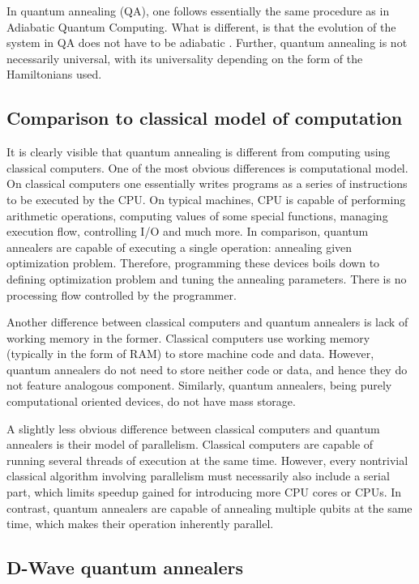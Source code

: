 In quantum annealing (QA), one follows essentially the same procedure as in Adiabatic Quantum
Computing. What is different, is that the evolution of the system in QA does not have to be
adiabatic \cite{Vinci2017}. Further, quantum annealing is not necessarily universal, with its
universality depending on the form of the Hamiltonians used. 


\subsection{Comparison to classical model of computation}
It is clearly visible that quantum annealing is different from computing using classical computers. One of the most obvious differences is computational model. On classical computers one essentially writes programs as a series of instructions to be executed by the CPU. On typical machines, CPU is capable of performing arithmetic operations, computing values of some special functions, managing execution flow, controlling I/O and much more. In comparison, quantum annealers are capable of executing a single operation: annealing given optimization problem. Therefore, programming these devices boils down to defining optimization problem and tuning the annealing parameters. There is no processing flow controlled by the programmer.

Another difference between classical computers and quantum annealers is lack of working memory in the former. Classical computers use working memory (typically in the form of RAM) to store machine code and data. However, quantum annealers do not need to store neither code or data, and hence they do not feature analogous component. Similarly, quantum annealers, being purely computational oriented devices, do not have mass storage.

A slightly less obvious difference between classical computers and quantum annealers is their model of parallelism. Classical computers are capable of running several threads of execution at the same time. However, every nontrivial classical algorithm involving parallelism must necessarily also include a serial part, which limits speedup gained for introducing more CPU cores or CPUs. In contrast, quantum annealers are capable of annealing multiple qubits at the same time, which makes their operation inherently parallel.

\subsection{D-Wave quantum annealers}

